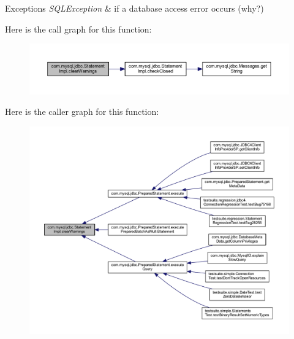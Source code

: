 \begin{DoxyExceptions}{Exceptions}
{\em S\+Q\+L\+Exception} & if a database access error occurs (why?) \\
\hline
\end{DoxyExceptions}
Here is the call graph for this function\+:
\nopagebreak
\begin{figure}[H]
\begin{center}
\leavevmode
\includegraphics[width=350pt]{classcom_1_1mysql_1_1jdbc_1_1_statement_impl_a3c483be7df71683de12dd730bd90059e_cgraph}
\end{center}
\end{figure}
Here is the caller graph for this function\+:
\nopagebreak
\begin{figure}[H]
\begin{center}
\leavevmode
\includegraphics[width=350pt]{classcom_1_1mysql_1_1jdbc_1_1_statement_impl_a3c483be7df71683de12dd730bd90059e_icgraph}
\end{center}
\end{figure}
\mbox{\label{classcom_1_1mysql_1_1jdbc_1_1_statement_impl_a740a220f82b06eace44154a089fbdf18}} 
